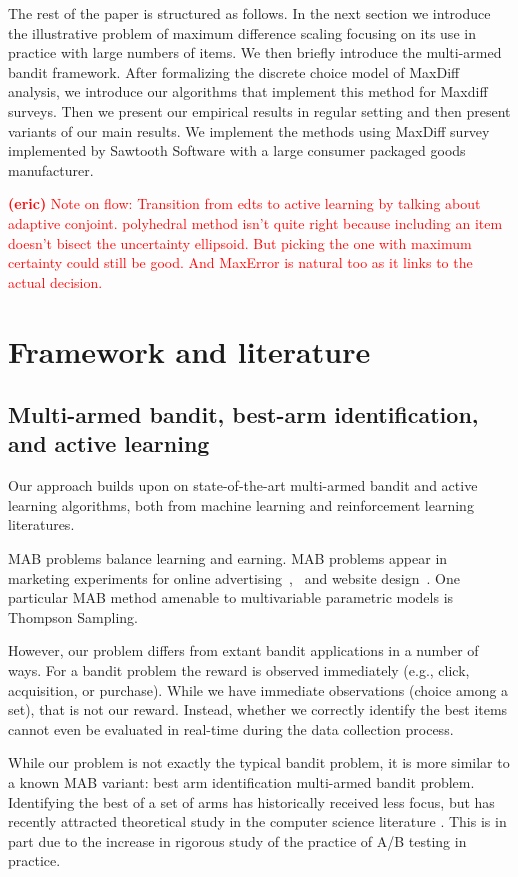\documentclass[nonblindrev]{informs3}
\newcommand{\eric}[1]{\textcolor{red}{\textbf{(eric)} #1}}
\begin{document}
The rest of the paper is structured as follows. In the next section we introduce the illustrative problem of maximum difference scaling focusing on its use in practice with large numbers of items. We then briefly introduce the multi-armed bandit framework. After formalizing the discrete choice model of MaxDiff analysis, we introduce our algorithms that implement this method for Maxdiff surveys. Then we present our empirical results in regular setting and then present variants of our main results. We implement the methods using MaxDiff survey implemented by Sawtooth Software with a large consumer packaged goods manufacturer. 

\eric{Note on flow:
Transition from edts to active learning by talking about adaptive conjoint.  polyhedral method isn't quite right because including an item doesn't bisect the uncertainty ellipsoid. But picking the one with maximum certainty could still be good. 
And MaxError is natural too as it links to the actual decision.}




\section{Framework and literature}

\subsection{Multi-armed bandit, best-arm identification, and active learning}
Our approach builds upon on state-of-the-art multi-armed bandit and active learning algorithms, both from machine learning and reinforcement learning literatures. 

MAB problems balance learning and earning. MAB problems appear in marketing experiments for online advertising~\cite{schwartz2015customer},~\cite{urban2013morphing} and website design~\cite{hauser2009website}. One particular MAB method amenable to multivariable parametric models is Thompson Sampling.

However, our problem differs from extant bandit applications in a number of ways. For a bandit problem the reward is observed immediately (e.g., click, acquisition, or purchase). While we have immediate observations (choice among a set), that is not our reward. Instead, whether we correctly identify the best items cannot even be evaluated in real-time during the data collection process. 

While our problem is not exactly the typical bandit problem, it is more similar to a known MAB variant: best arm identification multi-armed bandit problem. Identifying the best of a set of arms has historically received less focus, but has recently attracted theoretical study in the computer science literature \citep{gabillon2012best,kalyanakrishnan2012pac,kaufmann2016complexity,kaufmann2013information,russo2016simple}. This is in part due to the increase in rigorous study of the practice of A/B testing in practice. 
\end{document}
